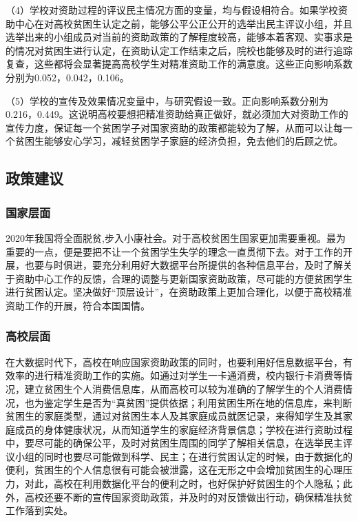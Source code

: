 \documentclass[UTF8,a4paper,12pt]{ctexart}  %
\begin{document}
（4）学校对资助过程的评议民主情况方面的变量，均与假设相符合。如果学校资助中心在对高校贫困生认定之前，能够公平公正公开的选举出民主评议小组，并且选举出来的小组成员对当前的资助政策的了解程度较高，能够本着客观、实事求是的情况对贫困生进行认定，在资助认定工作结束之后，院校也能够及时的进行追踪复查，这些都将会显著提高高校学生对精准资助工作的满意度。这些正向影响系数分别为0.052，0.042，0.106。

（5）学校的宣传及效果情况变量中，与研究假设一致。正向影响系数分别为0.216，0.449。这说明高校要想把精准资助给真正做好，就必须加大对资助工作的宣传力度，保证每一个贫困学子对国家资助的政策都能较为了解，从而可以让每一个贫困生能够安心学习，减轻贫困学子家庭的经济负担，免去他们的后顾之忧。

\hypertarget{section-34}{%
\subsection{政策建议}\label{section-34}}

\hypertarget{section-35}{%
\subsubsection{国家层面}\label{section-35}}

2020年我国将全面脱贫,步入小康社会。对于高校贫困生国家更加需要重视。最为重要的一点，便是要把不让一个贫困学生失学的理念一直贯彻下去。对于工作的开展，也要与时俱进，要充分利用好大数据平台所提供的各种信息平台，及时了解关于资助中心工作的反馈，合理的调整与更新国家资助政策，尽可能的方便贫困学生进行贫困认定。坚决做好``顶层设计''，在资助政策上更加合理化，以便于高校精准资助工作的开展，符合本国国情。

\hypertarget{section-36}{%
\subsubsection{高校层面}\label{section-36}}

在大数据时代下，高校在响应国家资助政策的同时，也要利用好信息数据平台，有效率的进行精准资助工作的实施。如通过对学生一卡通消费，校内银行卡消费等情况，建立贫困生个人消费信息库，从而高校可以较为准确的了解学生的个人消费情况，也为鉴定学生是否为``真贫困''提供依据；利用贫困生所在地的信息库，来判断贫困生的家庭类型，通过对贫困生本人及其家庭成员就医记录，来得知学生及其家庭成员的身体健康状况，从而知道学生的家庭经济背景信息；学校在进行资助过程中，要尽可能的确保公平，及时对贫困生周围的同学了解相关信息，在选举民主评议小组的同时也要尽可能做到科学、民主；在进行贫困认定的时候，由于数据化的便利，贫困生的个人信息很有可能会被泄露，这在无形之中会增加贫困生的心理压力，对此，高校在利用数据化平台的便利之时，也好保护好贫困生的个人隐私；此外，高校还要不断的宣传国家资助政策，并及时的对反馈做出行动，确保精准扶贫工作落到实处。
\end{document}
